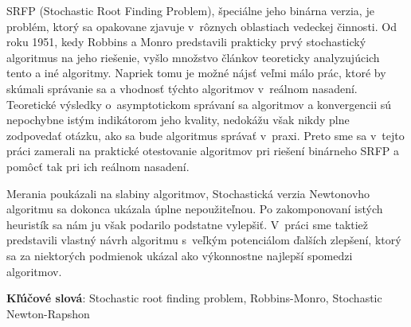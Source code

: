 \noindent SRFP (Stochastic Root Finding Problem), špeciálne jeho binárna verzia,
je problém, ktorý sa opakovane zjavuje v~rôznych oblastiach vedeckej činnosti.
Od roku 1951, kedy Robbins a Monro \cite{monro} predstavili prakticky prvý
stochastický algoritmus na jeho riešenie, vyšlo množstvo článkov teoreticky
analyzujúcich tento a iné algoritmy. Napriek tomu je možné nájsť veľmi málo
prác, ktoré by skúmali správanie sa a vhodnosť týchto algoritmov v~reálnom
nasadení. Teoretické výsledky o~asymptotickom správaní sa algoritmov a
konvergencii sú nepochybne istým indikátorom jeho kvality, nedokážu však nikdy
plne zodpovedať otázku, ako sa bude algoritmus správať v~praxi. Preto sme sa
v~tejto práci zamerali na praktické otestovanie algoritmov pri riešení binárneho
SRFP a pomôcť tak pri ich reálnom nasadení.

Merania poukázali na slabiny algoritmov, Stochastická verzia Newtonovho
algoritmu \cite{anbar} sa dokonca ukázala úplne nepoužiteľnou. Po zakomponovaní
istých heuristík sa nám ju však podarilo podstatne vylepšiť. V~práci sme taktiež
predstavili vlastný návrh algoritmu s~veľkým potenciálom ďalších zlepšení, ktorý
sa za niektorých podmienok ukázal ako výkonnostne najlepší spomedzi algoritmov.

\noindent\textbf{Kľúčové slová}: Stochastic root finding problem, Robbins-Monro,
Stochastic Newton-Rapshon
